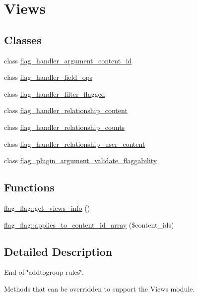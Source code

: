 \hypertarget{group__views}{
\section{Views}
\label{group__views}
}
\subsection*{Classes}
\begin{CompactItemize}
\item 
class \hyperlink{classflag__handler__argument__content__id}{flag\_\-handler\_\-argument\_\-content\_\-id}
\item 
class \hyperlink{classflag__handler__field__ops}{flag\_\-handler\_\-field\_\-ops}
\item 
class \hyperlink{classflag__handler__filter__flagged}{flag\_\-handler\_\-filter\_\-flagged}
\item 
class \hyperlink{classflag__handler__relationship__content}{flag\_\-handler\_\-relationship\_\-content}
\item 
class \hyperlink{classflag__handler__relationship__counts}{flag\_\-handler\_\-relationship\_\-counts}
\item 
class \hyperlink{classflag__handler__relationship__user__content}{flag\_\-handler\_\-relationship\_\-user\_\-content}
\item 
class \hyperlink{classflag__plugin__argument__validate__flaggability}{flag\_\-plugin\_\-argument\_\-validate\_\-flaggability}
\end{CompactItemize}
\subsection*{Functions}
\begin{CompactItemize}
\item 
\hyperlink{group__views_g91f53a4d24f7c81f8a913e56154821c0}{flag\_\-flag::get\_\-views\_\-info} ()
\item 
\hyperlink{group__views_g7ffe2653803be84d2c2d21dea608a6da}{flag\_\-flag::applies\_\-to\_\-content\_\-id\_\-array} (\$content\_\-ids)
\end{CompactItemize}


\subsection{Detailed Description}
End of \char`\"{}addtogroup rules\char`\"{}.

Methods that can be overridden to support the Views module. 

